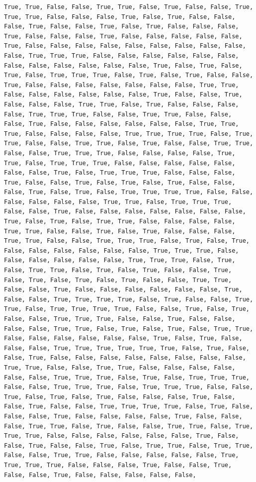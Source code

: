 \documentclass[
  letterpaper,
  DIV=11,
  numbers=noendperiod]{scrartcl}
\begin{document}
\begin{verbatim}
True, True, False, False, True, True, False, True, False, False, True, True, True, False, False, False, True, False, True, False, False, False, True, False, False, True, False, True, False, False, False, True, False, False, False, True, False, False, False, False, False, True, False, False, False, False, False, False, False, False, False, False, True, True, True, False, False, False, False, False, False, False, False, False, False, False, False, True, False, True, False, True, False, True, True, True, False, True, False, True, False, False, True, False, False, False, False, False, False, False, True, True, False, False, False, False, False, False, True, False, False, True, False, False, False, True, True, False, True, False, False, False, False, True, True, True, False, False, True, True, False, False, False, True, False, False, False, False, False, False, True, True, True, False, False, False, False, True, True, True, True, False, True, True, False, False, True, True, False, True, False, False, True, True, False, False, True, True, True, False, False, False, False, True, True, False, True, True, True, False, False, False, False, False, False, False, True, False, True, True, True, False, False, False, True, False, False, True, False, True, False, True, False, False, False, True, False, True, False, True, True, True, True, False, False, False, False, False, False, True, True, False, True, True, True, False, False, True, False, False, False, False, False, False, False, True, False, True, False, True, True, False, False, False, False, True, True, False, False, True, False, True, False, False, False, True, True, False, False, True, True, True, False, True, False, True, False, False, False, False, False, False, True, True, True, False, False, False, False, False, False, True, True, True, False, True, False, True, True, False, True, False, True, False, False, True, False, True, False, True, False, True, False, False, True, True, False, False, True, False, False, False, False, False, False, True, False, False, True, True, True, True, False, True, False, False, True, True, False, True, True, True, True, False, False, True, False, True, False, False, True, True, True, False, False, True, False, False, False, False, True, True, False, True, False, True, False, True, True, False, False, False, False, False, False, True, False, True, False, False, False, True, True, True, True, True, True, False, True, False, False, True, False, False, False, False, False, False, False, False, True, True, False, False, True, True, False, False, False, False, False, False, True, True, True, False, True, False, True, True, True, False, False, True, True, True, False, True, True, True, False, False, True, False, True, False, True, False, False, False, True, False, False, True, False, False, True, True, True, True, False, True, False, False, False, True, False, False, False, False, True, False, False, False, True, True, False, True, False, False, True, True, False, True, True, True, False, False, False, False, False, False, True, False, False, True, False, False, True, False, True, True, False, True, True, False, False, True, True, False, False, False, False, False, True, True, True, True, False, False, False, True, False, False, True, False, False, True, False, False, False, False, False, 
\end{verbatim}
\end{document}
